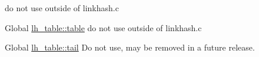 \begin{DoxyRefList}
%
do not use outside of linkhash.\+c  
\item[Global \mbox{\hyperlink{structlh__table_a37ce3fea914f225f4b96d7108fa522d5}{lh\+\_\+table\+::table}} ]\label{deprecated__deprecated000020}%
%
do not use outside of linkhash.\+c  
\item[Global \mbox{\hyperlink{structlh__table_a0144d938d7e47406fe76ebe51ad5f857}{lh\+\_\+table\+::tail}} ]\label{deprecated__deprecated000019}%
%
Do not use, may be removed in a future release. 
\end{DoxyRefList}